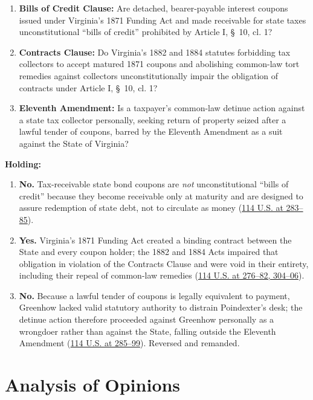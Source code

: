 \documentclass[12pt]{article}
\begin{document}
\begin{enumerate}
  \item \textbf{Bills of Credit Clause:} Are detached, bearer-payable interest coupons issued under Virginia's 1871 Funding Act and made receivable for state taxes unconstitutional ``bills of credit'' prohibited by Article I, \S~10, cl. 1?
  \item \textbf{Contracts Clause:} Do Virginia's 1882 and 1884 statutes forbidding tax collectors to accept matured 1871 coupons and abolishing common-law tort remedies against collectors unconstitutionally impair the obligation of contracts under Article I, \S~10, cl. 1?
  \item \textbf{Eleventh Amendment:} Is a taxpayer's common-law detinue action against a state tax collector personally, seeking return of property seized after a lawful tender of coupons, barred by the Eleventh Amendment as a suit against the State of Virginia?
\end{enumerate}

\textbf{Holding:}

\begin{enumerate}
  \item \textbf{No.} Tax-receivable state bond coupons are \emph{not} unconstitutional ``bills of credit'' because they become receivable only at maturity and are designed to assure redemption of state debt, not to circulate as money (\href{https://supreme.justia.com/cases/federal/us/114/270/}{114 U.S. at 283--85}).
  \item \textbf{Yes.} Virginia's 1871 Funding Act created a binding contract between the State and every coupon holder; the 1882 and 1884 Acts impaired that obligation in violation of the Contracts Clause and were void in their entirety, including their repeal of common-law remedies (\href{https://supreme.justia.com/cases/federal/us/114/270/}{114 U.S. at 276--82, 304--06}).
  \item \textbf{No.} Because a lawful tender of coupons is legally equivalent to payment, Greenhow lacked valid statutory authority to distrain Poindexter's desk; the detinue action therefore proceeded against Greenhow personally as a wrongdoer rather than against the State, falling outside the Eleventh Amendment (\href{https://supreme.justia.com/cases/federal/us/114/270/}{114 U.S. at 285--99}). Reversed and remanded.
\end{enumerate}

\section{Analysis of Opinions}
\end{document}

